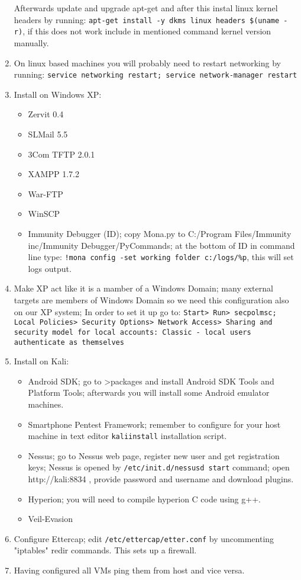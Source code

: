 \begin{enumerate}
{    Afterwards update and upgrade apt-get and after this instal linux kernel headers by running:
    \texttt{apt-get install -y dkms linux headers \$(uname -r)},  \newline
    if this does not work include in mentioned command kernel version manually.
    }
    \item{On linux based machines you will probably need to restart networking by running: \texttt{service networking restart; service network-manager restart}}
    \item{Install on Windows XP:}
    \begin{itemize}
        \item{Zervit 0.4}
        \item{SLMail 5.5}
        \item{3Com TFTP 2.0.1}
        \item{XAMPP 1.7.2}
        \item{War-FTP}
        \item{WinSCP}
        \item{Immunity Debugger (ID); copy Mona.py to C:/Program Files/Immunity inc/Immunity Debugger/PyCommands; at the bottom of ID
        in command line type: \texttt{!mona config -set working folder c:/logs/\%p}, this will set logs output.}

    \end{itemize}
    \item{Make XP act like it is a mamber of a Windows Domain; many external targets are members of Windows Domain so we need this configuration
    also on our XP system; In order to set it up go to: \texttt{Start> Run> secpolmsc; Local Policies> Security Options> Network Access> Sharing and security model for local accounts:
    Classic - local users authenticate as themselves}}

    \item{Install on Kali:}


    \begin{itemize}
        \item{Android SDK; go to >packages and install Android SDK Tools and Platform Tools; afterwards you will install some Android emulator machines.}
        \item{Smartphone Pentest Framework; remember to configure for your host machine in text editor \texttt{kaliinstall} installation script.}
        \item{Nessus; go to Nessus web page, register new user and get registration keys; Nessus is opened by
        \texttt{/etc/init.d/nessusd start} command; open http://kali:8834 , provide password and username and download plugins.}
        \item{Hyperion; you will need to compile hyperion C code using g++.}
        \item{Veil-Evasion}
    \end{itemize}
    \item{Configure Ettercap; edit \texttt{/etc/ettercap/etter.conf} by uncommenting "iptables" redir commands. This sets up a firewall.}
    \item{Having configured all VMs ping them from host and vice versa.}
\end{enumerate}
